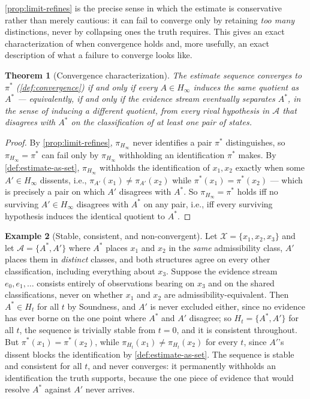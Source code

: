 \documentclass[11pt]{book}
\theoremstyle{plain}
\newtheorem{theorem}{Theorem}[chapter]
\theoremstyle{definition}
\newtheorem{example}[theorem]{Example}
\theoremstyle{remark}
\begin{document}
\cref{prop:limit-refines} is the precise sense in which the estimate
is conservative rather than merely cautious: it can fail to converge
only by retaining \emph{too many} distinctions, never by collapsing
ones the truth requires. This gives an exact characterization of when
convergence holds and, more usefully, an exact description of what a
failure to converge looks like.

\begin{theorem}[Convergence characterization]
\label{thm:convergence-characterization}
The estimate sequence converges to $\pi^*$ (\cref{def:convergence}) if
and only if every $A \in H_\infty$ induces the same quotient as $A^*$
--- equivalently, if and only if the evidence stream eventually
separates $A^*$, in the sense of inducing a different quotient, from
every rival hypothesis in $\mathcal{A}$ that disagrees with $A^*$ on
the classification of at least one pair of states.
\end{theorem}

\begin{proof}
By \cref{prop:limit-refines}, $\pi_{H_\infty}$ never identifies a pair
$\pi^*$ distinguishes, so $\pi_{H_\infty} = \pi^*$ can fail only by
$\pi_{H_\infty}$ withholding an identification $\pi^*$ makes. By
\cref{def:estimate-as-set}, $\pi_{H_\infty}$ withholds the
identification of $x_1, x_2$ exactly when some $A' \in H_\infty$
dissents, i.e., $\pi_{A'}(x_1) \neq \pi_{A'}(x_2)$ while
$\pi^*(x_1) = \pi^*(x_2)$ --- which is precisely a pair on which $A'$
disagrees with $A^*$. So $\pi_{H_\infty} = \pi^*$ holds iff no
surviving $A' \in H_\infty$ disagrees with $A^*$ on any pair, i.e.,
iff every surviving hypothesis induces the identical quotient to
$A^*$.
\end{proof}

\begin{example}[Stable, consistent, and non-convergent]
\label{ex:non-convergence}
Let $\mathcal{X} = \{x_1, x_2, x_3\}$ and let $\mathcal{A} = \{A^*,
A'\}$ where $A^*$ places $x_1$ and $x_2$ in the \emph{same}
admissibility class, $A'$ places them in \emph{distinct} classes, and
both structures agree on every other classification, including
everything about $x_3$. Suppose the evidence stream $e_0, e_1, \dots$
consists entirely of observations bearing on $x_3$ and on the shared
classifications, never on whether $x_1$ and $x_2$ are
admissibility-equivalent. Then $A^* \in H_t$ for all $t$ by Soundness,
and $A'$ is never excluded either, since no evidence has ever borne on
the one point where $A^*$ and $A'$ disagree; so $H_t = \{A^*, A'\}$
for all $t$, the sequence is trivially stable from $t = 0$, and it is
consistent throughout. But $\pi^*(x_1) = \pi^*(x_2)$, while
$\pi_{H_t}(x_1) \neq \pi_{H_t}(x_2)$ for every $t$, since $A'$'s
dissent blocks the identification by \cref{def:estimate-as-set}. The
sequence is stable and consistent for all $t$, and never converges: it
permanently withholds an identification the truth supports, because
the one piece of evidence that would resolve $A^*$ against $A'$ never
arrives.
\end{example}
\end{document}

